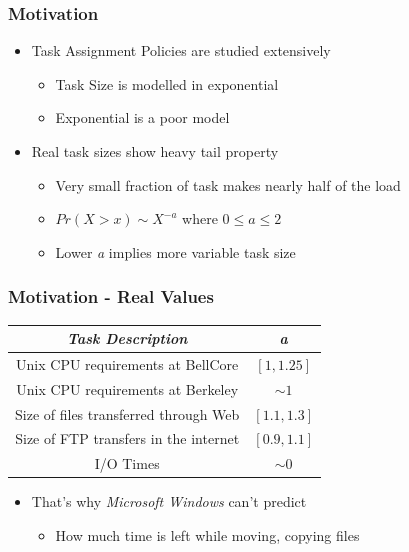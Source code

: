\documentclass[red]{beamer}
\begin{document}
\begin{frame}
  \frametitle{Motivation}  

  \begin{itemize}
  \item<1-> Task Assignment Policies are studied extensively
    \begin{itemize}
  	  \item<1-> Task Size is modelled in exponential 
 	  \item<1-> Exponential is a poor model
    \end{itemize}
  \item<2-> Real task sizes show heavy tail property
    \begin{itemize}
  	  \item<2-> Very small fraction of task makes nearly half of the load
 	  \item<2-> $Pr(X > x) \sim X^{-a}$ where $ 0 \le a \le 2$
 	  \item<2-> Lower \textit{a} implies more variable task size
    \end{itemize}
  
  \end{itemize}
\end{frame}

\begin{frame}
	\frametitle{Motivation - Real Values}
	
	\begin{center}

	\begin{tabular}{|c|c|}
	\hline
		\textbf{\textit{Task Description}}    & \textbf{\textit{a}}\\		
	\hline
		Unix CPU requirements at BellCore     & $ [ 1, 1.25 ]$ \\
	\hline
		Unix CPU requirements at Berkeley     & $ \sim 1 $ \\
	\hline
		Size of files transferred through Web & $ [ 1.1, 1.3 ]$ \\
	\hline
		Size of FTP transfers in the internet & $ [ 0.9, 1.1 ]$ \\
	\hline
		I/O Times & $ \sim 0 $ \\
	\hline
	\end{tabular}
	\end{center}
	
    \begin{itemize}
	\item That's why \textit{Microsoft Windows} can't predict 
	  \begin{itemize}
		\item How much time is left while moving, copying files
	  \end{itemize}		
	\end{itemize}	
\end{frame}
\end{document}
